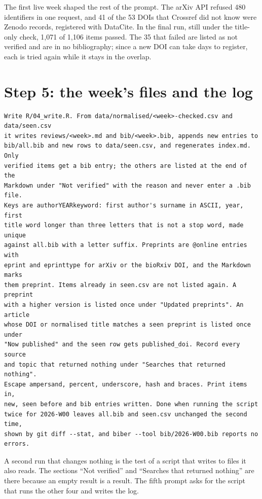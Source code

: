 The first live week shaped the rest of the prompt. The arXiv API refused 480
identifiers in one request, and 41 of the 53 DOIs that Crossref did not know
were Zenodo records, registered with DataCite. In the final run, still under
the title-only check, 1,071 of 1,106 items passed. The 35 that failed are
listed as not verified and are in no bibliography; since a new DOI can take
days to register, each is tried again while it stays in the overlap.

\section{Step 5: the week's files and the log}

\begin{lstlisting}[caption={The fourth prompt}]
Write R/04_write.R. From data/normalised/<week>-checked.csv and data/seen.csv
it writes reviews/<week>.md and bib/<week>.bib, appends new entries to
bib/all.bib and new rows to data/seen.csv, and regenerates index.md. Only
verified items get a bib entry; the others are listed at the end of the
Markdown under "Not verified" with the reason and never enter a .bib file.
Keys are authorYEARkeyword: first author's surname in ASCII, year, first
title word longer than three letters that is not a stop word, made unique
against all.bib with a letter suffix. Preprints are @online entries with
eprint and eprinttype for arXiv or the bioRxiv DOI, and the Markdown marks
them preprint. Items already in seen.csv are not listed again. A preprint
with a higher version is listed once under "Updated preprints". An article
whose DOI or normalised title matches a seen preprint is listed once under
"Now published" and the seen row gets published_doi. Record every source
and topic that returned nothing under "Searches that returned nothing".
Escape ampersand, percent, underscore, hash and braces. Print items in,
new, seen before and bib entries written. Done when running the script
twice for 2026-W00 leaves all.bib and seen.csv unchanged the second time,
shown by git diff --stat, and biber --tool bib/2026-W00.bib reports no
errors.
\end{lstlisting}

A second run that changes nothing is the test of a script that writes to
files it also reads. The sections ``Not verified'' and ``Searches that
returned nothing'' are there because an empty result is a result. The fifth
prompt asks for the script that runs the other four and writes the log.

